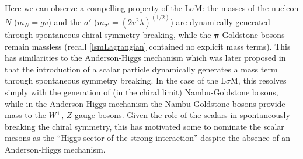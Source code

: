 \documentclass[aps,prd,onecolumn,showpacs,amsmath,amssymb,nofootinbib]{revtex4} \pdfoutput=1
\newcommand{\lsm}{L$\sigma$M}
\begin{document}
Here we can observe a compelling property of the \lsm: the masses of the nucleon $N$ ($m_N = gv$) and the $\sigma'$ ($m_{\sigma'} = (2 v^2 \lambda)^(1/2)$) are dynamically generated through spontaneous chiral symmetry breaking, while the $\mathbf{\pi}$ Goldstone bosons remain massless (recall \eqref{lsmLagrangian} contained no explicit mass terms). This has similarities to the Anderson-Higgs mechanism which was later proposed \cite{higgs1,higgs2,higgs3} in that the introduction of a scalar particle dynamically generates a mass term through spontaneous symmetry breaking. In the case of the \lsm, this resolves simply with the generation of (in the chiral limit) Nambu-Goldstone bosons, while in the Anderson-Higgs mechanism the Nambu-Goldstone bosons provide mass to the $W^{\pm},\,Z$ gauge bosons. Given the role of the scalars in spontaneously breaking the chiral symmetry, this has motivated some to nominate the scalar mesons as the ``Higgs sector of the strong interaction'' \cite{Pennington2005,Schumacher2011}  despite the absence of an Anderson-Higgs mechanism.
\end{document}
